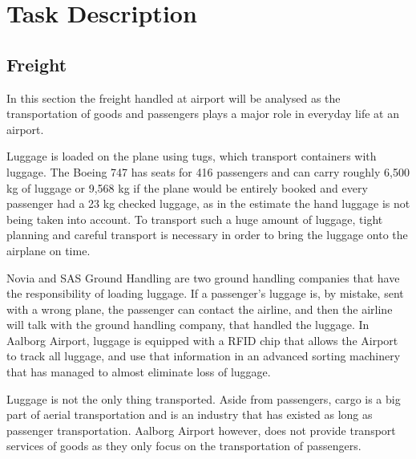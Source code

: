 \section{Task Description}
\subsection{Freight}
In this section the freight handled at airport will be analysed as the transportation of goods and passengers plays a major role in everyday life at an airport. 

Luggage is loaded on the plane using tugs, which transport containers with luggage. The Boeing 747 has seats for 416 passengers\cite{freight_boing} and can carry roughly 6,500 kg of luggage or 9,568 kg if the plane would be entirely booked and every passenger had a 23 kg checked luggage, as in the estimate the hand luggage is not being taken into account. To transport such a huge amount of luggage, tight planning and careful transport is necessary in order to bring the luggage onto the airplane on time.

Novia and SAS Ground Handling are two ground handling companies that have the responsibility of loading luggage\cite{mistet_bagage}. If a passenger's luggage is, by mistake, sent with a wrong plane, the passenger can contact the airline, and then the airline will talk with the ground handling company, that handled the luggage. In Aalborg Airport, luggage is equipped with a RFID chip that allows the Airport to track all luggage, and use that information in an advanced sorting machinery that has managed to almost eliminate loss of luggage.


Luggage is not the only thing transported. Aside from passengers, cargo is a big part of aerial transportation and is an industry that has existed as long as passenger transportation. Aalborg Airport however, does not provide transport services of goods as they only focus on the transportation of passengers.
%
%


